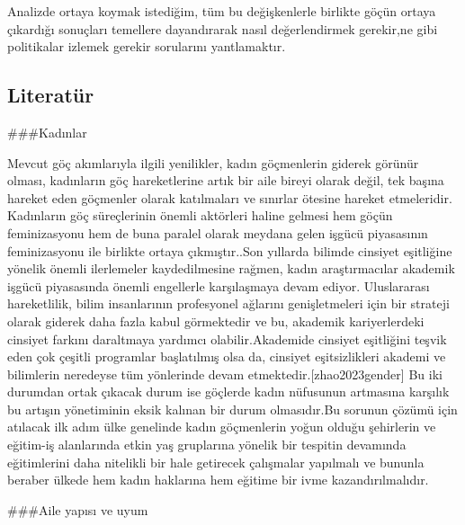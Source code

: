 \documentclass[
  12pt,
]{article}
\begin{document}
Analizde ortaya koymak istediğim, tüm bu değişkenlerle birlikte göçün ortaya çıkardığı sonuçları temellere dayandırarak nasıl değerlendirmek gerekir,ne gibi politikalar izlemek gerekir sorularını yantlamaktır.

\hypertarget{literatuxfcr}{%
\subsection{Literatür}\label{literatuxfcr}}

\#\#\#Kadınlar

Mevcut göç akımlarıyla ilgili yenilikler, kadın göçmenlerin giderek görünür olması, kadınların göç hareketlerine artık bir aile bireyi olarak değil, tek başına hareket eden göçmenler olarak katılmaları ve sınırlar ötesine hareket etmeleridir. Kadınların göç süreçlerinin önemli aktörleri haline gelmesi hem göçün feminizasyonu hem de buna paralel olarak meydana gelen işgücü piyasasının feminizasyonu ile birlikte ortaya çıkmıştır..Son yıllarda bilimde cinsiyet eşitliğine yönelik önemli ilerlemeler kaydedilmesine rağmen, kadın araştırmacılar akademik işgücü piyasasında önemli engellerle karşılaşmaya devam ediyor. Uluslararası hareketlilik, bilim insanlarının profesyonel ağlarını genişletmeleri için bir strateji olarak giderek daha fazla kabul görmektedir ve bu, akademik kariyerlerdeki cinsiyet farkını daraltmaya yardımcı olabilir.Akademide cinsiyet eşitliğini teşvik eden çok çeşitli programlar başlatılmış olsa da, cinsiyet eşitsizlikleri akademi ve bilimlerin neredeyse tüm yönlerinde devam etmektedir.{[}zhao2023gender{]} Bu iki durumdan ortak çıkacak durum ise göçlerde kadın nüfusunun artmasına karşılık bu artışın yönetiminin eksik kalınan bir durum olmasıdır.Bu sorunun çözümü için atılacak ilk adım ülke genelinde kadın göçmenlerin yoğun olduğu şehirlerin ve eğitim-iş alanlarında etkin yaş gruplarına yönelik bir tespitin devamında eğitimlerini daha nitelikli bir hale getirecek çalışmalar yapılmalı ve bununla beraber ülkede hem kadın haklarına hem eğitime bir ivme kazandırılmalıdır.

\#\#\#Aile yapısı ve uyum
\end{document}
